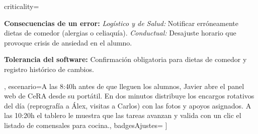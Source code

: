 \documentclass[10pt]{article}
\begin{document}
    criticality={%
        \item \textbf{Consecuencias de un error:} \textit{Logístico y de Salud:} Notificar erróneamente dietas de comedor (alergias o celiaquía). \textit{Conductual:} Desajuste horario que provoque crisis de ansiedad en el alumno.
        \item \textbf{Tolerancia del software:} Confirmación obligatoria para dietas de comedor y registro histórico de cambios.
    },
    escenario={A las 8:40h antes de que lleguen los alumnos, Javier abre el panel web de CeRA desde su portátil. En dos minutos distribuye los encargos rotativos del día (reprografía a Álex, visitas a Carlos) con las fotos y apoyos asignados. A las 10:20h el tablero le muestra que las tareas avanzan y valida con un clic el listado de comensales para cocina.},
    badgesAjustes={%
         \hspace{2mm}
         \hspace{2mm}
         \hspace{2mm}
    }%
]
\end{document}
